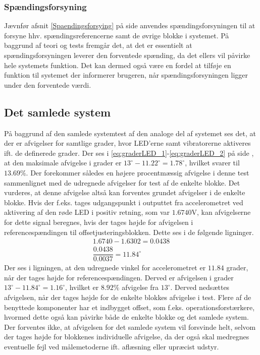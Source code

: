 \subsubsection{Spændingsforsyning}
Jævnfør afsnit \ref{Spaendingsforsying} på side \pageref{Spaendingsforsying} anvendes spændingsforsyningen til at forsyne hhv. spændingsreferencerne samt de øvrige blokke i systemet. På baggrund af teori og tests fremgår det, at det er essentielt at spændingsforsyningen leverer den forventede spænding, da det ellers vil påvirke hele systemets funktion. Det kan dermed også være en fordel at tilføje en funktion til systemet der informerer brugeren, når spændingsforsyningen ligger under den forventede værdi. 
 
\subsection{Det samlede system}
På baggrund af den samlede systemtest af den analoge del af systemet ses det, at der er afvigelser for samtlige grader, hvor LED'erne samt vibratorerne aktiveres ift. de definerede grader. Der ses i \eqref{eq:graderLED_1}-\eqref{eq:graderLED_2} på side \pageref{eq:graderLED_1}, at den maksimale afvigelse i grader er $13^{\circ} - 11.22^{\circ} = 1.78^{\circ}$, hvilket svarer til $13.69\%$. Der forekommer således en højere procentmæssig afvigelse i denne test sammenlignet med de udregnede afvigelser for test af de enkelte blokke. Det vurderes, at denne afvigelse altså kan forventes grundet afvigelser i de enkelte blokke. Hvis der f.eks. tages udgangspunkt i outputtet fra accelerometret ved aktivering af den røde LED i positiv retning, som var $1.6740$V, kan afvigelserne for dette signal beregnes, hvis der tages højde for afvigelsen i referencespændingen til offsetjusteringsblokken. Dette ses i de følgende ligninger.
\begin{eqnarray}
1.6740 - 1.6302 = 0.0438 \\
\dfrac{0.0438}{0.0037} = 11.84^{\circ}
\end{eqnarray}
Der ses i ligningen, at den udregnede vinkel for accelerometret er $11.84$ grader, når der tages højde for referencespændingen. Derved er afvigelsen i grader $13^{\circ} - 11.84^{\circ} = 1.16^{\circ}$, hvilket er $8.92\%$ afvigelse fra $13^{\circ}$. Derved nedsættes afvigelsen, når der tages højde for de enkelte blokkes afvigelse i test. Flere af de benyttede komponenter har et indbygget offset, som f.eks. operationsforstærkere, hvormed dette også kan påvirke både de enkelte blokke og det samlede system. Der forventes ikke, at afvigelsen for det samlede system vil forsvinde helt, selvom der tages højde for blokkenes individuelle afvigelse, da der også skal medregnes eventuelle fejl ved målemetoderne ift. aflæsning eller upræcist udstyr. \\
